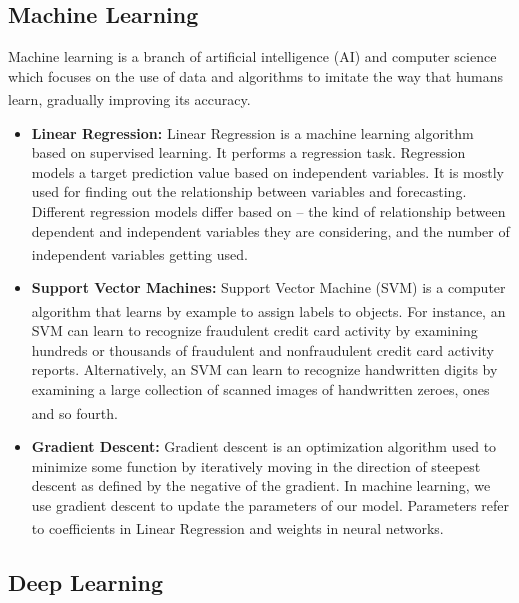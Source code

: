 \vspace{0.2in}



\subsection{Machine Learning}
Machine learning is a branch of artificial intelligence (AI) and computer science which focuses on the use of data and algorithms to imitate the way that humans learn, gradually improving its accuracy. \textsuperscript{\cite{ML-IBM}}

\begin{itemize}
  \item \textbf{Linear Regression:}
      Linear Regression is a machine learning algorithm based on supervised learning. It performs a regression task. Regression models a target prediction value based on independent variables. It is mostly used for finding out the relationship between variables and forecasting. Different regression models differ based on – the kind of relationship between dependent and independent variables they are considering, and the number of independent variables getting used. \textsuperscript{\cite{LR-GeeksForGeeks}}
  \item \textbf{Support Vector Machines:}
      Support Vector Machine (SVM) is a computer algorithm that learns by example to assign labels to objects. \textsuperscript{\cite{boser1992training}} For instance, an SVM can learn to recognize fraudulent credit card activity by examining hundreds or thousands of fraudulent and nonfraudulent credit card activity reports. Alternatively, an SVM can learn to recognize handwritten digits by examining a large collection of scanned images of handwritten zeroes, ones and so fourth. \textsuperscript{\cite{noble2006support}}
  \item \textbf{Gradient Descent:}
      Gradient descent is an optimization algorithm used to minimize some function by iteratively moving in the direction of steepest descent as defined by the negative of the gradient. In machine learning, we use gradient descent to update the parameters of our model. Parameters refer to coefficients in Linear Regression and weights in neural networks. \textsuperscript{\cite{DG-ml-cheatsheet}}
\end{itemize}

\subsection{Deep Learning}
